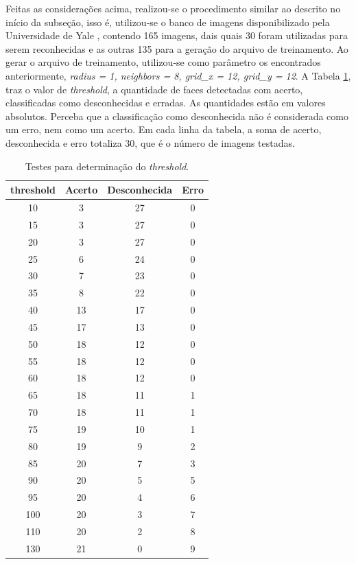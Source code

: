 Feitas as considerações acima, realizou-se o procedimento similar ao descrito no início da subseção, isso é, utilizou-se o banco de imagens  disponibilizado pela Universidade de Yale \citep{yales}, contendo 165 imagens, dais quais 30 foram utilizadas para serem reconhecidas e as outras 135 para a geração do arquivo de treinamento. Ao gerar o arquivo de treinamento, utilizou-se como parâmetro os  encontrados anteriormente, \textit{radius = 1, neighbors = 8, grid\_x = 12, grid\_y = 12}. A Tabela \ref{tab:tabela2}, traz o valor de \textit{threshold}, a quantidade de faces detectadas com acerto, classificadas como desconhecidas e erradas. As quantidades estão em valores absolutos. Perceba que a classificação como desconhecida não é considerada como um erro, nem como um acerto. Em cada linha da tabela, a soma de acerto, desconhecida e erro totaliza 30, que é o número de imagens testadas.


\begin{table}[ht]
\centering
\caption{Testes para determinação do \textit{threshold}.}
\vspace{0.5cm}
\begin{tabular}{cccc}
 
threshold & Acerto & Desconhecida & Erro \\
\hline
10	& 3	& 27	& 0   \\
15	& 3	& 27	& 0  \\
20	& 3	& 27	& 0  \\
25	& 6	& 24	& 0  \\
30	& 7	& 23	& 0  \\
35	& 8	& 22	& 0  \\  
40	& 13	& 17	& 0  \\
45	& 17	& 13	& 0  \\
50	& 18	& 12	& 0  \\
55	& 18	& 12	& 0  \\
60	& 18	& 12	& 0  \\
65	& 18	& 11	& 1  \\
70	& 18	& 11	& 1  \\  
75	& 19	& 10	& 1  \\
80	& 19	& 9	& 2  \\
85	& 20	& 7	& 3  \\
90	& 20	& 5	& 5  \\
95	& 20	& 4	& 6  \\
100	& 20	& 3	& 7  \\
110	& 20	& 2	& 8  \\
130	& 21	& 0	& 9  \\


\end{tabular}
\label{tab:tabela2}
\end{table}

